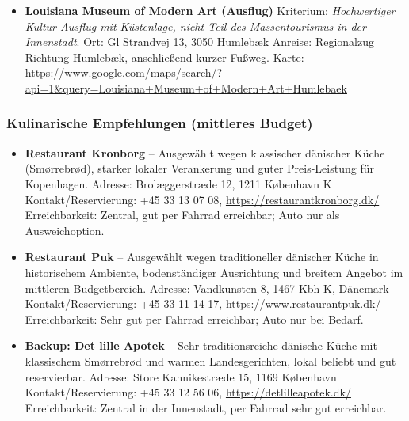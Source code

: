 \documentclass[a4paper,12pt]{article}
\begin{document}
\begin{itemize}
\item \textbf{Louisiana Museum of Modern Art (Ausflug)}\newline
Kriterium: \textit{Hochwertiger Kultur-Ausflug mit Küstenlage, nicht Teil des Massentourismus in der Innenstadt}.\newline
Ort: Gl Strandvej 13, 3050 Humlebæk\newline
Anreise: Regionalzug Richtung Humlebæk, anschließend kurzer Fußweg.\newline
Karte: \url{https://www.google.com/maps/search/?api=1&query=Louisiana+Museum+of+Modern+Art+Humlebaek}
\end{itemize}

\subsubsection{Kulinarische Empfehlungen (mittleres Budget)}
\begin{itemize}
\item \textbf{Restaurant Kronborg} -- Ausgewählt wegen klassischer dänischer Küche (Smørrebrød), starker lokaler Verankerung und guter Preis-Leistung für Kopenhagen.\newline
Adresse: Brolæggerstræde 12, 1211 København K\newline
Kontakt/Reservierung: +45 33 13 07 08, \url{https://restaurantkronborg.dk/}\newline
Erreichbarkeit: Zentral, gut per Fahrrad erreichbar; Auto nur als Ausweichoption.

\item \textbf{Restaurant Puk} -- Ausgewählt wegen traditioneller dänischer Küche in historischem Ambiente, bodenständiger Ausrichtung und breitem Angebot im mittleren Budgetbereich.\newline
Adresse: Vandkunsten 8, 1467 Kbh K, Dänemark\newline
Kontakt/Reservierung: +45 33 11 14 17, \url{https://www.restaurantpuk.dk/}\newline
Erreichbarkeit: Sehr gut per Fahrrad erreichbar; Auto nur bei Bedarf.

\item \textbf{Backup: Det lille Apotek} -- Sehr traditionsreiche dänische Küche mit klassischem Smørrebrød und warmen Landesgerichten, lokal beliebt und gut reservierbar.\newline
Adresse: Store Kannikestræde 15, 1169 København\newline
Kontakt/Reservierung: +45 33 12 56 06, \url{https://detlilleapotek.dk/}\newline
Erreichbarkeit: Zentral in der Innenstadt, per Fahrrad sehr gut erreichbar.
\end{itemize}
\end{document}
